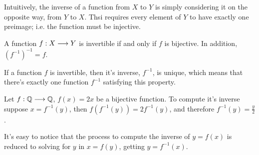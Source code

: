Intuitively, the inverse of a function from $X$ to $Y$ is simply considering it on the opposite way, from $Y$ to $X$. Thsi requires every element of $Y$ to have exactly one preimage; i.e. the function must be injective.

\begin{prop}
    A function $f : X\longrightarrow Y$ is invertible if and only if $f$ is bijective. In addition, $\left( f^{-1} \right)^{-1} = f $.
\end{prop}

\begin{prop}
    If a function $f$ is invertible, then it's inverse, $f^{-1}$, is unique, which means that there's exactly one function $f^{-1}$ satisfying this property.
\end{prop}

\begin{example}
    Let $f : \mathbb{Q}\longrightarrow \mathbb{Q}$, $f\left( x \right) = 2x$ be a bijective function. To compute it's inverse suppose $x = f^{-1}\left( y \right) $, then $f\left( f^{-1}\left( y \right)  \right) = 2f^{-1}\left( y \right) $, and therefore $f^{-1}\left( y \right) = \frac{y}{2}$.
\end{example}

\begin{remark}
    It's easy to notice that the process to compute the inverse of $y = f\left( x \right) $ is reduced to solving for $y$ in $x = f\left( y \right) $, getting $y = f^{-1}\left( x \right) $.
\end{remark}

